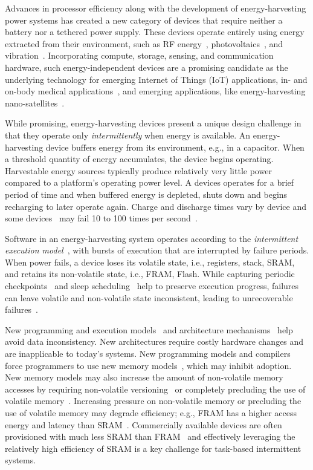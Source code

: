 Advances in processor efficiency along with the development of energy-harvesting power systems has created a new category of devices that require neither a battery nor a tethered power supply. These devices operate entirely using energy extracted from their environment, such as RF energy~\cite{}, photovoltaics~\cite{}, and vibration~\cite{}. Incorporating compute, storage, sensing, and communication hardware, such energy-independent devices are a promising candidate as the underlying technology for emerging Internet of Things (IoT) applications, in- and on-body medical applications~\cite{}, and emerging applications, like energy-harvesting nano-satellites~\cite{}.

While promising, energy-harvesting devices present a unique design challenge in
that they operate only {\em intermittently} when energy is available. An
energy-harvesting device buffers energy from its environment, e.g., in a
capacitor. When a threshold quantity of energy accumulates, the device begins
operating. Harvestable energy sources typically produce relatively very little
power compared to a platform's operating power level. A devices operates for a
brief period of time and when buffered energy is depleted, shuts down and
begins recharging to later operate again. Charge and discharge times vary by
device and some devices~\cite{wisp} may fail 10 to 100 times per second~\cite{}.

Software in an energy-harvesting system operates according to the {\em
intermittent execution model}~\cite{dino}, with bursts of execution that are
interrupted by failure periods. When power fails, a device loses its volatile
state, i.e., registers, stack, SRAM, and retains its non-volatile state, i.e.,
FRAM, Flash. While capturing periodic checkpoints~\cite{mementos,tictpl,quickrecall}
and sleep scheduling~\cite{dewdrop,hibernus,hibernusplusplus} help to preserve
execution progress, failures can leave volatile and non-volatile state inconsistent, leading to unrecoverable failures~\cite{mspcdino,edb,edbtoppicks}. 


New programming and execution models~\cite{dino,ratchet,chain,alpaca} and
architecture mechanisms~\cite{clank,idetic,nvp} help avoid data
inconsistency. New architectures require costly hardware changes and are
inapplicable to today's systems. New programming models and compilers force
programmers to use new memory models~\cite{chain,ratchet}, which may inhibit
adoption. New memory models may also increase the amount of non-volatile
memory accesses by requiring non-volatile versioning~\cite{chain} or completely
precluding the use of volatile memory~\cite{ratchet}. Increasing pressure on
non-volatile memory or precluding the use of volatile memory may degrade
efficiency; e.g., FRAM has a higher access energy and latency than
SRAM~\cite{alpaca,wisp}. Commercially available devices are often provisioned
with much less SRAM than FRAM~\cite{wolverine,wisp} and effectively leveraging
the relatively high efficiency of SRAM is a key challenge for task-based
intermittent systems.

